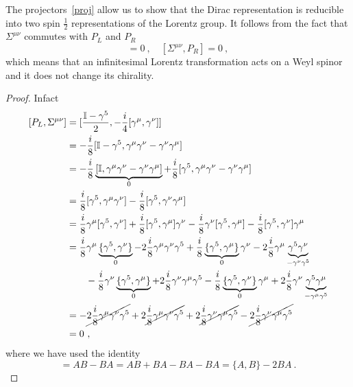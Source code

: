     The projectors~\eqref{proj} allow us to show that the Dirac representation is reducible into two spin $\frac{1}{2}$ representations of the Lorentz group. It follows from the fact that $\Sigma^{\mu\nu}$ commutes with $P_L$ and $P_R$
    \begin{equation*}
        [\Sigma^{\mu\nu}, P_L] = 0 ~, \quad [\Sigma^{\mu\nu}, P_R] = 0 ~,
    \end{equation*}
    which means that an infinitesimal Lorentz transformation acts on a Weyl spinor and it does not change its chirality. 
    \begin{proof}
        Infact 
        \begin{equation*}
        \begin{aligned}
            [P_L, \Sigma^{\mu\nu}] & = [\frac{\mathbb I - \gamma^5}{2}, - \frac{i}{4} [\gamma^\mu, \gamma^\nu]] \\ & = - \frac{i}{8} [\mathbb I - \gamma^5, \gamma^\mu \gamma^\nu - \gamma^\nu \gamma^\mu] \\ & = - \frac{i}{8} \underbrace{[\mathbb I, \gamma^\mu \gamma^\nu - \gamma^\nu \gamma^\mu]}_0 + \frac{i}{8} [\gamma^5, \gamma^\mu \gamma^\nu - \gamma^\nu \gamma^\mu] \\ & = \frac{i}{8} [\gamma^5, \gamma^\mu \gamma^\nu] - \frac{i}{8}  [\gamma^5, \gamma^\nu \gamma^\mu] \\ & = \frac{i}{8} \gamma^\mu [\gamma^5, \gamma^\nu] + \frac{i}{8} [\gamma^5, \gamma^\mu ] \gamma^\nu - \frac{i}{8}  \gamma^\nu [\gamma^5, \gamma^\mu] - \frac{i}{8}  [\gamma^5, \gamma^\nu] \gamma^\mu \\ & = \frac{i}{8} \gamma^\mu \underbrace{\{\gamma^5, \gamma^\nu\}}_0 - 2 \frac{i}{8} \gamma^\mu \gamma^\nu \gamma^5 + \frac{i}{8} \underbrace{\{\gamma^5, \gamma^\mu \}}_0 \gamma^\nu - 2 \frac{i}{8} \gamma^\mu \underbrace{\gamma^5 \gamma^\nu}_{- \gamma^\nu \gamma^5} \\ & \qquad - \frac{i}{8}  \gamma^\nu \underbrace{\{\gamma^5, \gamma^\mu\}}_0 + 2 \frac{i}{8} \gamma^\nu \gamma^\mu \gamma^5 - \frac{i}{8} \underbrace{\{\gamma^5, \gamma^\nu\}}_0 \gamma^\mu + 2 \frac{i}{8} \gamma^\nu \underbrace{\gamma^5 \gamma^\mu}_{- \gamma^\mu \gamma^5} \\ & = - \cancel{2 \frac{i}{8} \gamma^\mu \gamma^\nu \gamma^5} + 2 \cancel{\frac{i}{8} \gamma^\mu \gamma^\nu \gamma^5} + 2 \cancel{\frac{i}{8}  \gamma^\nu \gamma^\mu \gamma^5} - \cancel{2 \frac{i}{8} \gamma^\nu \gamma^\mu \gamma^5} \\ & = 0 ~,
        \end{aligned}
        \end{equation*}
        where we have used the identity
        \begin{equation*}
            [A, B] = AB - BA = AB + BA - BA - BA = \{A, B\} - 2 B A ~.
        \end{equation*}
    \end{proof}

